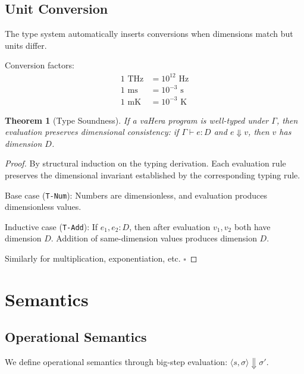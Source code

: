 \documentclass[twocolumn,10pt]{article}
\newtheorem{theorem}{Theorem}[section]
\theoremstyle{definition}
\theoremstyle{remark}
\begin{document}
\subsection{Unit Conversion}

The type system automatically inserts conversions when dimensions match but units differ.

Conversion factors:
\begin{align}
    1 \text{ THz} &= 10^{12} \text{ Hz} \\
    1 \text{ ms} &= 10^{-3} \text{ s} \\
    1 \text{ mK} &= 10^{-3} \text{ K}
\end{align}

\begin{theorem}[Type Soundness]
If a vaHera program is well-typed under $\Gamma$, then evaluation preserves dimensional consistency: if $\Gamma \vdash e : D$ and $e \Downarrow v$, then $v$ has dimension $D$.
\end{theorem}

\begin{proof}
By structural induction on the typing derivation. Each evaluation rule preserves the dimensional invariant established by the corresponding typing rule.

Base case (\texttt{T-Num}): Numbers are dimensionless, and evaluation produces dimensionless values.

Inductive case (\texttt{T-Add}): If $e_1, e_2 : D$, then after evaluation $v_1, v_2$ both have dimension $D$. Addition of same-dimension values produces dimension $D$.

Similarly for multiplication, exponentiation, etc. $\square$
\end{proof}

\section{Semantics}
\label{sec:semantics}

\subsection{Operational Semantics}

We define operational semantics through big-step evaluation: $\langle s, \sigma \rangle \Downarrow \sigma'$.
\end{document}
